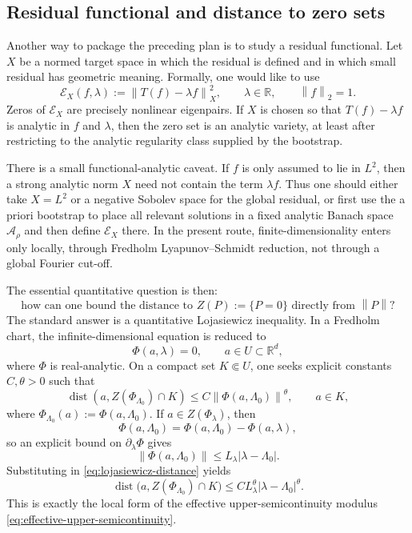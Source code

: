 \documentclass[12pt]{article}
\theoremstyle{definition}
\theoremstyle{remark}
\newcommand{\R}{\mathbb{R}}
\newcommand{\norm}[1]{\left\|#1\right\|}
\begin{document}
\subsection{Residual functional and distance to zero sets}
\label{sec:residual-functional}

Another way to package the preceding plan is to study a residual
functional.  Let $X$ be a normed target space in which the residual is
defined and in which small residual has geometric meaning.  Formally,
one would like to use
\begin{equation}\label{eq:residual-functional}
  \mathcal E_X(f,\lambda)
  :=
  \norm{T(f)-\lambda f}_X^2,
  \qquad \lambda\in\R,\qquad \norm f_2=1.
\end{equation}
Zeros of $\mathcal E_X$ are precisely nonlinear eigenpairs.  If $X$ is
chosen so that $T(f)-\lambda f$ is analytic in $f$ and $\lambda$, then
the zero set is an analytic variety, at least after restricting to the
analytic regularity class supplied by the bootstrap.

There is a small functional-analytic caveat.  If $f$ is only assumed to
lie in $L^2$, then a strong analytic norm $X$ need not contain the term
$\lambda f$.  Thus one should either take $X=L^2$ or a negative Sobolev
space for the global residual, or first use the a priori bootstrap to
place all relevant solutions in a fixed analytic Banach space
$\mathcal A_\rho$ and then define $\mathcal E_X$ there.  In the present
route, finite-dimensionality enters only locally, through Fredholm
Lyapunov--Schmidt reduction, not through a global Fourier cut-off.

The essential quantitative question is then:
\[
  \text{how can one bound the distance to } Z(P):=\{P=0\}
  \text{ directly from } \norm{P}?
\]
The standard answer is a quantitative Lojasiewicz inequality.  In a
Fredholm chart, the infinite-dimensional equation is reduced to
\[
  \Phi(a,\lambda)=0,
  \qquad a\in U\subset\R^d,
\]
where $\Phi$ is real-analytic.  On a compact set $K\Subset U$, one seeks
explicit constants $C,\theta>0$ such that
\begin{equation}\label{eq:lojasiewicz-distance}
  \operatorname{dist}(a,Z(\Phi_{\Lambda_0})\cap K)
  \leq C\norm{\Phi(a,\Lambda_0)}^\theta,
  \qquad a\in K,
\end{equation}
where $\Phi_{\Lambda_0}(a):=\Phi(a,\Lambda_0)$.  If
$a\in Z(\Phi_\lambda)$, then
\[
  \Phi(a,\Lambda_0)
  =
  \Phi(a,\Lambda_0)-\Phi(a,\lambda),
\]
so an explicit bound on $\partial_\lambda\Phi$ gives
\[
  \norm{\Phi(a,\Lambda_0)}
  \leq L_\lambda|\lambda-\Lambda_0|.
  \]
Substituting in \eqref{eq:lojasiewicz-distance} yields
\begin{equation}\label{eq:zero-set-distance-from-loj}
  \operatorname{dist}\bigl(a,Z(\Phi_{\Lambda_0})\cap K\bigr)
  \leq C L_\lambda^\theta |\lambda-\Lambda_0|^\theta.
\end{equation}
This is exactly the local form of the effective upper-semicontinuity
modulus \eqref{eq:effective-upper-semicontinuity}.
\end{document}
